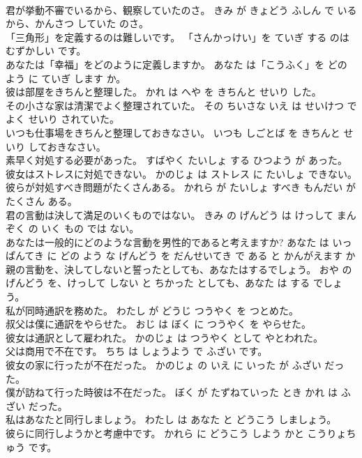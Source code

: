 \documentclass[8pt]{extreport}
\begin{document}
\begin{CJK}{UTF8}{min}
\\	君が挙動不審でいるから、観察していたのさ。	きみ が きょどう ふしん で いる から、かんさつ していた のさ。	
\\	「三角形」を定義するのは難しいです。	「さんかっけい」を ていぎ する のは むずかしい です。	
\\	あなたは「幸福」をどのように定義しますか。	あなた は「こうふく」を どの よう に ていぎ します か。	
\\	彼は部屋をきちんと整理した。	かれ は へや を きちんと せいり した。	
\\	その小さな家は清潔でよく整理されていた。	その ちいさな いえ は せいけつ で よく せいり されていた。	
\\	いつも仕事場をきちんと整理しておきなさい。	いつも しごとば を きちんと せいり しておきなさい。	
\\	素早く対処する必要があった。	すばやく たいしょ する ひつよう が あった。	
\\	彼女はストレスに対処できない。	かのじょ は ストレス に たいしょ できない。	
\\	彼らが対処すべき問題がたくさんある。	かれら が たいしょ すべき もんだい が たくさん ある。	
\\	君の言動は決して満足のいくものではない。	きみ の げんどう は けっして まんぞく の いく もの では ない。	
\\	あなたは一般的にどのような言動を男性的であると考えますか?	あなた は いっぱんてき に どの よう な げんどう を だんせいてき で ある と かんがえます か 
\\	親の言動を、決してしないと誓ったとしても、あなたはするでしょう。	おや の げんどう を、けっして しない と ちかった としても、あなた は する でしょう。	
\\	私が同時通訳を務めた。	わたし が どうじ つうやく を つとめた。	
\\	叔父は僕に通訳をやらせた。	おじ は ぼく に つうやく を やらせた。	
\\	彼女は通訳として雇われた。	かのじょ は つうやく として やとわれた。	
\\	父は商用で不在です。	ちち は しょうよう で ふざい です。	
\\	彼女の家に行ったが不在だった。	かのじょ の いえ に いった が ふざい だった。	
\\	僕が訪ねて行った時彼は不在だった。	ぼく が たずねていった とき かれ は ふざい だった。	
\\	私はあなたと同行しましょう。	わたし は あなた と どうこう しましょう。	
\\	彼らに同行しようかと考慮中です。	かれら に どうこう しよう かと こうりょちゅう です。	

\end{CJK}
\end{document}
